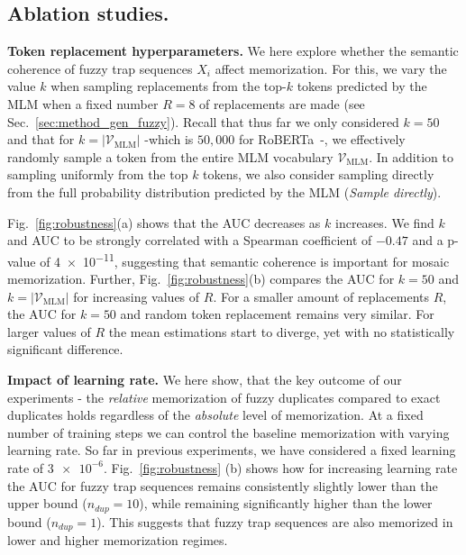 \subsection{Ablation studies.} \label{section:ablations}

\textbf{Token replacement hyperparameters.} We here explore whether the semantic coherence of fuzzy trap sequences $X_i$ affect memorization. For this, we vary the value $k$ when sampling replacements from the top-$k$ tokens predicted by the MLM when a fixed number $R=8$ of replacements are made (see Sec.~\ref{sec:method_gen_fuzzy}). Recall that thus far we only considered $k=50$ and that for $k=|\mathcal{V}_{\text{MLM}}|$ -which is $50,000$ for RoBERTa~\cite{liu2019roberta}-, we effectively randomly sample a token from the entire MLM vocabulary $\mathcal{V}_{\text{MLM}}$. In addition to sampling uniformly from the top $k$ tokens, we also consider sampling directly from the full probability distribution predicted by the MLM (\textit{Sample directly}).

Fig.~\ref{fig:robustness}(a) shows that the AUC decreases as $k$ increases. We find $k$ and AUC to be strongly correlated with a Spearman coefficient of $-0.47$ and a p-value of \num{4e-11}, suggesting that semantic coherence is important for mosaic memorization. Further, Fig.~\ref{fig:robustness}(b) compares the AUC for $k=50$ and $k=|\mathcal{V}_{\text{MLM}}|$ for increasing values of $R$. For a smaller amount of replacements $R$, the AUC for $k=50$ and random token replacement remains very similar. For larger values of $R$ the mean estimations start to diverge, yet with no statistically significant difference.

\textbf{Impact of learning rate.} We here show, that the key outcome of our experiments - the \emph{relative} memorization of fuzzy duplicates compared to exact duplicates holds regardless of the \emph{absolute} level of memorization. At a fixed number of training steps we can control the baseline memorization with varying learning rate. So far in previous experiments, we have considered a fixed learning rate of $\num{3e-6}$. Fig.~\ref{fig:robustness} (b) shows how for increasing learning rate the AUC for fuzzy trap sequences remains consistently slightly lower than the upper bound ($n_{dup} = 10$), while remaining significantly higher than the lower bound ($n_{dup} = 1$). This suggests that fuzzy trap sequences are also memorized in lower and higher memorization regimes. 

